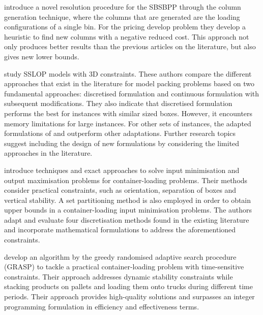 \autocite{Mahvash2018} introduce a novel resolution procedure for the SBSBPP through the column generation technique, where the columns that are generated are the loading configurations of a single bin. For the pricing develop problem they develop a heuristic to find new columns with a negative reduced cost.  This approach not only produces better results than the previous articles on the literature, but also gives new lower bounds.




\autocite{Silva2019ExactProblems} study SSLOP models with 3D constraints. These authors compare the different approaches that exist in the literature for model packing problems based on two fundamental approaches: discretised formulation \autocite{Junqueira2013AnConstraints} and continuous formulation \autocite{Chen1995EUROPEANProblem} with subsequent modifications. They also indicate that discretised formulation\autocite{Junqueira2012MIP-basedConstraints} performs the best for instances with similar sized boxes. However, it encounters memory limitations for large instances. For other sets of instances, the adapted formulations of \autocite{Chen1995EUROPEANProblem} and \autocite{2016Paquay} outperform other adaptations. Further research topics suggest including the design of new formulations by considering the limited approaches in the literature.



\autocite{Kurpel2020TheProblems} introduce techniques and exact approaches to solve input minimisation and output maximisation problems for container-loading problems. Their methods consider practical constraints, such as orientation, separation of boxes and vertical stability. A set partitioning method is also employed in order to obtain upper bounds in a  container-loading input minimisation problems. The authors adapt and evaluate four discretisation methods found in the existing literature and incorporate mathematical formulations to address the aforementioned constraints.



\autocite{Alonso2020AConstraints} develop an algorithm by the greedy randomised adaptive search procedure (GRASP) to tackle a practical container-loading problem with time-sensitive constraints. Their approach addresses dynamic stability constraints while stacking products on pallets and loading them onto trucks during different time periods. Their approach provides high-quality solutions and surpasses an integer programming formulation in efficiency and effectiveness terms.

